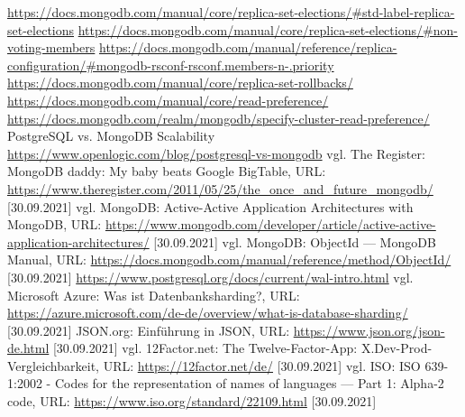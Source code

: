 \begin{thebibliography}{2}
         \url{https://docs.mongodb.com/manual/core/replica-set-elections/#std-label-replica-set-elections}
         \url{https://docs.mongodb.com/manual/core/replica-set-elections/#non-voting-members}
         \url{https://docs.mongodb.com/manual/reference/replica-configuration/#mongodb-rsconf-rsconf.members-n-.priority}
         \url{https://docs.mongodb.com/manual/core/replica-set-rollbacks/}
         \url{https://docs.mongodb.com/manual/core/read-preference/}
         \url{https://docs.mongodb.com/realm/mongodb/specify-cluster-read-preference/}
         PostgreSQL vs. MongoDB Scalability \url{https://www.openlogic.com/blog/postgresql-vs-mongodb}
         vgl. The Register: MongoDB daddy: My baby beats Google BigTable, URL: \url{https://www.theregister.com/2011/05/25/the_once_and_future_mongodb/} [30.09.2021]
         vgl. MongoDB: Active-Active Application Architectures with MongoDB, URL: \url{https://www.mongodb.com/developer/article/active-active-application-architectures/} [30.09.2021]
         vgl. MongoDB: ObjectId — MongoDB Manual, URL: \url{https://docs.mongodb.com/manual/reference/method/ObjectId/} [30.09.2021]
         \url{https://www.postgresql.org/docs/current/wal-intro.html}
         vgl. Microsoft Azure: Was ist Datenbanksharding?, URL: \url{https://azure.microsoft.com/de-de/overview/what-is-database-sharding/} [30.09.2021]
         JSON.org: Einführung in JSON, URL: \url{https://www.json.org/json-de.html} [30.09.2021]
         vgl. 12Factor.net: The Twelve-Factor-App: X.Dev-Prod-Vergleichbarkeit, URL: \url{https://12factor.net/de/} [30.09.2021]
         vgl. ISO: ISO 639-1:2002 - Codes for the representation of names of languages — Part 1: Alpha-2 code, URL: \url{https://www.iso.org/standard/22109.html} [30.09.2021]
\end{thebibliography}

